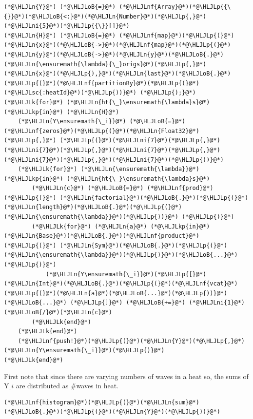 \documentclass[12pt,a4paper]{article}
\newcommand{\HLJLk}[1]{\textcolor[RGB]{148,91,176}{\textbf{#1}}}
\newcommand{\HLJLkp}[1]{\textcolor[RGB]{148,91,176}{\textbf{#1}}}
\newcommand{\HLJLn}[1]{#1}
\newcommand{\HLJLnf}[1]{\textcolor[RGB]{66,102,213}{#1}}
\newcommand{\HLJLsc}[1]{\textcolor[RGB]{201,61,57}{#1}}
\newcommand{\HLJLni}[1]{\textcolor[RGB]{59,151,46}{#1}}
\newcommand{\HLJLoB}[1]{\textcolor[RGB]{102,102,102}{\textbf{#1}}}
\newcommand{\HLJLp}[1]{#1}
\begin{document}
\begin{lstlisting}
(*@\HLJLn{Y}@*) (*@\HLJLoB{=}@*) (*@\HLJLnf{Array}@*)(*@\HLJLp{{\{}}@*)(*@\HLJLoB{<:}@*)(*@\HLJLn{Number}@*)(*@\HLJLp{,}@*)(*@\HLJLni{5}@*)(*@\HLJLp{{\}}[]}@*)
(*@\HLJLn{H}@*) (*@\HLJLoB{=}@*) (*@\HLJLnf{map}@*)(*@\HLJLp{(}@*)(*@\HLJLn{x}@*)(*@\HLJLoB{->}@*)(*@\HLJLnf{map}@*)(*@\HLJLp{(}@*)(*@\HLJLn{y}@*)(*@\HLJLoB{->}@*)(*@\HLJLn{y}@*)(*@\HLJLoB{.}@*)(*@\HLJLn{\ensuremath{\lambda}{\_}origs}@*)(*@\HLJLp{,}@*)(*@\HLJLn{x}@*)(*@\HLJLp{),}@*)(*@\HLJLn{last}@*)(*@\HLJLoB{.}@*)(*@\HLJLp{(}@*)(*@\HLJLnf{partitionBy}@*)(*@\HLJLp{(}@*)(*@\HLJLsc{:heatId}@*)(*@\HLJLp{))}@*) (*@\HLJLp{);}@*)
(*@\HLJLk{for}@*) (*@\HLJLn{ht{\_}\ensuremath{\lambda}s}@*) (*@\HLJLkp{in}@*) (*@\HLJLn{H}@*)
	(*@\HLJLn{Y\ensuremath{\_i}}@*) (*@\HLJLoB{=}@*) (*@\HLJLnf{zeros}@*)(*@\HLJLp{(}@*)(*@\HLJLn{Float32}@*)(*@\HLJLp{,}@*) (*@\HLJLp{(}@*)(*@\HLJLni{7}@*)(*@\HLJLp{,}@*)(*@\HLJLni{7}@*)(*@\HLJLp{,}@*)(*@\HLJLni{7}@*)(*@\HLJLp{,}@*)(*@\HLJLni{7}@*)(*@\HLJLp{,}@*)(*@\HLJLni{7}@*)(*@\HLJLp{))}@*)
	(*@\HLJLk{for}@*) (*@\HLJLn{\ensuremath{\lambda}}@*) (*@\HLJLkp{in}@*) (*@\HLJLn{ht{\_}\ensuremath{\lambda}s}@*)
		(*@\HLJLn{c}@*) (*@\HLJLoB{=}@*) (*@\HLJLnf{prod}@*)(*@\HLJLp{(}@*) (*@\HLJLn{factorial}@*)(*@\HLJLoB{.}@*)(*@\HLJLp{(}@*)(*@\HLJLn{length}@*)(*@\HLJLoB{.}@*)(*@\HLJLp{(}@*)(*@\HLJLn{\ensuremath{\lambda}}@*)(*@\HLJLp{))}@*) (*@\HLJLp{)}@*)
		(*@\HLJLk{for}@*) (*@\HLJLn{a}@*) (*@\HLJLkp{in}@*) (*@\HLJLn{Base}@*)(*@\HLJLoB{.}@*)(*@\HLJLnf{product}@*)(*@\HLJLp{(}@*) (*@\HLJLn{Sym}@*)(*@\HLJLoB{.}@*)(*@\HLJLp{(}@*)(*@\HLJLn{\ensuremath{\lambda}}@*)(*@\HLJLp{)}@*)(*@\HLJLoB{...}@*)(*@\HLJLp{)}@*)
			(*@\HLJLn{Y\ensuremath{\_i}}@*)(*@\HLJLp{[}@*) (*@\HLJLn{Int}@*)(*@\HLJLoB{.}@*)(*@\HLJLp{(}@*)(*@\HLJLnf{vcat}@*)(*@\HLJLp{(}@*)(*@\HLJLn{a}@*)(*@\HLJLoB{...}@*)(*@\HLJLp{))}@*)(*@\HLJLoB{...}@*) (*@\HLJLp{]}@*) (*@\HLJLoB{+=}@*) (*@\HLJLni{1}@*)(*@\HLJLoB{/}@*)(*@\HLJLn{c}@*)
		(*@\HLJLk{end}@*)
	(*@\HLJLk{end}@*)
	(*@\HLJLnf{push!}@*)(*@\HLJLp{(}@*)(*@\HLJLn{Y}@*)(*@\HLJLp{,}@*)(*@\HLJLn{Y\ensuremath{\_i}}@*)(*@\HLJLp{)}@*)
(*@\HLJLk{end}@*)
\end{lstlisting}


First note that since there are varying numbers of waves in a heat so, the sums of Y\ensuremath{\_i} are distributed as \#waves in heat.


\begin{lstlisting}
(*@\HLJLnf{histogram}@*)(*@\HLJLp{(}@*)(*@\HLJLn{sum}@*)(*@\HLJLoB{.}@*)(*@\HLJLp{(}@*)(*@\HLJLn{Y}@*)(*@\HLJLp{))}@*)
\end{lstlisting}
\end{document}
